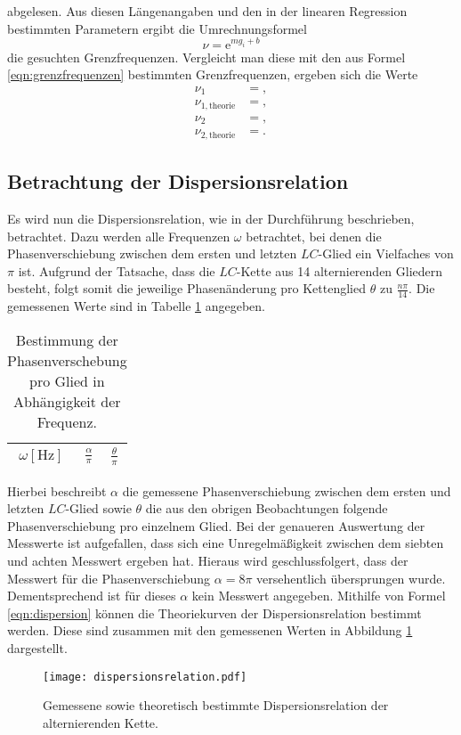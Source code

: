 abgelesen.
Aus diesen Längenangaben und den in der linearen Regression bestimmten Parametern ergibt die Umrechnungsformel
\begin{equation}
  \nu = \mathrm{e}^{m g_i + b}
\end{equation}
die gesuchten Grenzfrequenzen.
Vergleicht man diese mit den aus Formel \ref{eqn:grenzfrequenzen} bestimmten Grenzfrequenzen, ergeben sich die Werte
\begin{align*}
  \nu_{1} &= , \\
  \nu_{1, \text{theorie}} &= , \\
  \nu_{2} &= , \\
  \nu_{2, \text{theorie}} &= .
\end{align*}


\subsection{Betrachtung der Dispersionsrelation}
Es wird nun die Dispersionsrelation, wie in der Durchführung beschrieben, betrachtet.
Dazu werden alle Frequenzen $\omega$ betrachtet, bei denen die Phasenverschiebung zwischen dem ersten und letzten $LC$-Glied ein Vielfaches von $\pi$ ist.
Aufgrund der Tatsache, dass die $LC$-Kette aus 14 alternierenden Gliedern besteht, folgt somit die jeweilige Phasenänderung pro Kettenglied $\theta$ zu $\frac{n \pi}{14}$.
Die gemessenen Werte sind in Tabelle \ref{tab:dispersion} angegeben.
\begin{table}
  \centering
  \caption{Bestimmung der Phasenverschebung pro Glied in Abhängigkeit der Frequenz.}
  \label{tab:dispersion}
  \begin{tabular}{c c c}
    \toprule
    {$\omega [\si{\hertz}]$} & {$\frac{\alpha}{\pi} $} & {$\frac{\theta}{\pi} $}\\
    \midrule
    
    \bottomrule
  \end{tabular}
\end{table}
Hierbei beschreibt $\alpha$ die gemessene Phasenverschiebung zwischen dem ersten und letzten $LC$-Glied sowie $\theta$ die aus den obrigen Beobachtungen folgende Phasenverschiebung pro einzelnem Glied.
Bei der genaueren Auswertung der Messwerte ist aufgefallen, dass sich eine Unregelmäßigkeit zwischen dem siebten und achten Messwert ergeben hat.
Hieraus wird geschlussfolgert, dass der Messwert für die Phasenverschiebung $\alpha = 8 \pi$ versehentlich übersprungen wurde.
Dementsprechend ist für dieses $\alpha$ kein Messwert angegeben.
Mithilfe von Formel \ref{eqn:dispersion} können die Theoriekurven der Dispersionsrelation bestimmt werden.
Diese sind zusammen mit den gemessenen Werten in Abbildung \ref{fig:dispersion_fertig} dargestellt.
\begin{figure}[H]
  \centering
  \texttt{[image: dispersionsrelation.pdf]}
  \caption{Gemessene sowie theoretisch bestimmte Dispersionsrelation der alternierenden Kette.}
  \label{fig:dispersion_fertig}
\end{figure}

